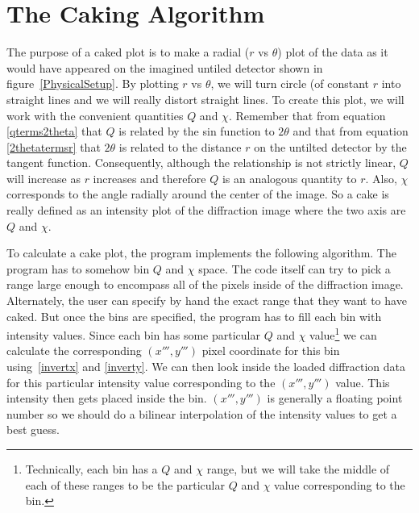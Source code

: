 \section{The Caking Algorithm}

The purpose of a caked plot is to make a radial 
($r$ vs $\theta$) plot of the data as it would have 
appeared on the imagined untiled detector shown in 
figure~\ref{PhysicalSetup}. By plotting $r$ vs $\theta$,
we will turn circle (of constant $r$ into straight lines 
and we will really distort straight lines.
To create this plot, we will work with the 
convenient quantities $Q$ and $\chi$. Remember that
from equation \ref{qterms2theta} that $Q$ is
related by the sin function to $2\theta$ and that
from equation \ref{2thetatermsr} that $2\theta$
is related to the distance $r$ on the untilted 
detector by the tangent function. 
Consequently, although the relationship is not 
strictly linear, $Q$ will increase as $r$ increases
and therefore $Q$ is an analogous quantity to $r$.
Also, $\chi$ corresponds to the angle radially
around the center of the image. So a cake is really
defined as an intensity plot of the diffraction 
image where the two axis are $Q$ and $\chi$.

To calculate a cake plot, the program implements
the following algorithm. The program has to somehow bin $Q$ and 
$\chi$ space. The code itself can try to pick
a range large enough to encompass all of the 
pixels inside of the diffraction image. Alternately,
the user can specify by hand the exact range that
they want to have caked. But once the bins are
specified, the program has to fill each bin with
intensity values. Since each bin has some 
particular $Q$ and $\chi$ value\footnote{Technically,
each bin has a $Q$ and $\chi$ range, but we will
take the middle of each of these ranges to be the
particular $Q$ and $\chi$ value corresponding to the
bin.} we can calculate the corresponding $(x''',y''')$
pixel coordinate for this bin using~\ref{invertx} and 
\ref{inverty}. We can then
look inside the loaded diffraction data for
this particular intensity value corresponding
to the $(x''',y''')$ value. This intensity then
gets placed inside the bin. $(x''',y''')$
is generally a floating point number so we should
do a bilinear interpolation of the intensity values
to get a best guess.

